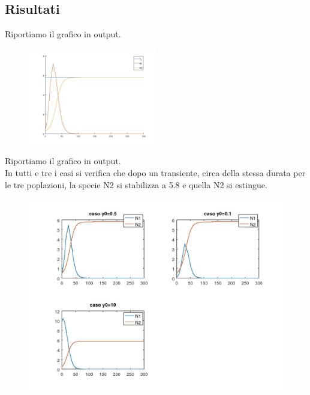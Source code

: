 \documentclass{article}
\begin{document}
	\subsection{Risultati}
	Riportiamo il grafico in output.\\
	\begin{figure}[htp!]
		\centering 
		\includegraphics[width=0.5\textwidth]{4_1_1.jpeg}
	\end{figure}
	\newpage
	Riportiamo il grafico in output.\\
	In tutti e tre i casi si verifica che dopo un transiente, circa della stessa durata per le tre poplazioni, la specie N2 si stabilizza a 5.8 e quella N2 si estingue.\\
	\begin{figure}[htp!]
	\centering 
	\includegraphics[width=\textwidth]{4_1_2.jpeg}
	\end{figure}
\end{document}
